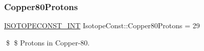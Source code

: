 \subsubsection{\texorpdfstring{Copper80\+Protons}{Copper80Protons}}
{\footnotesize\ttfamily \mbox{\hyperlink{group___isotope_const-_macros_ga5f18360b3e99483a35c32d789e62621c}{I\+S\+O\+T\+O\+P\+E\+C\+O\+N\+S\+T\+\_\+\+I\+NT}} Isotope\+Const\+::\+Copper80\+Protons = 29}

\$ \$ Protons in Copper-\/80. 